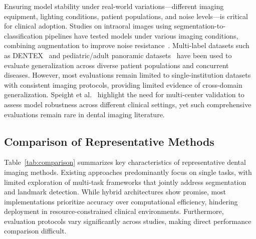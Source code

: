 Ensuring model stability under real-world variations---different imaging equipment, lighting conditions, patient populations, and noise levels---is critical for clinical adoption. Studies on intraoral images using segmentation-to-classification pipelines have tested models under various imaging conditions, combining augmentation to improve noise resistance~\cite{nguyen2022caries}. Multi-label datasets such as DENTEX~\cite{hamamci2023dentex} and pediatric/adult panoramic datasets~\cite{alsakar2024multilabel} have been used to evaluate generalization across diverse patient populations and concurrent diseases. However, most evaluations remain limited to single-institution datasets with consistent imaging protocols, providing limited evidence of cross-domain generalization. Speight et al.~\cite{speight2017screening} highlight the need for multi-center validation to assess model robustness across different clinical settings, yet such comprehensive evaluations remain rare in dental imaging literature.

\subsection{Comparison of Representative Methods}
\label{subsec:comparison}

Table~\ref{tab:comparison} summarizes key characteristics of representative dental imaging methods. Existing approaches predominantly focus on single tasks, with limited exploration of multi-task frameworks that jointly address segmentation and landmark detection. While hybrid architectures show promise, most implementations prioritize accuracy over computational efficiency, hindering deployment in resource-constrained clinical environments. Furthermore, evaluation protocols vary significantly across studies, making direct performance comparison difficult.

